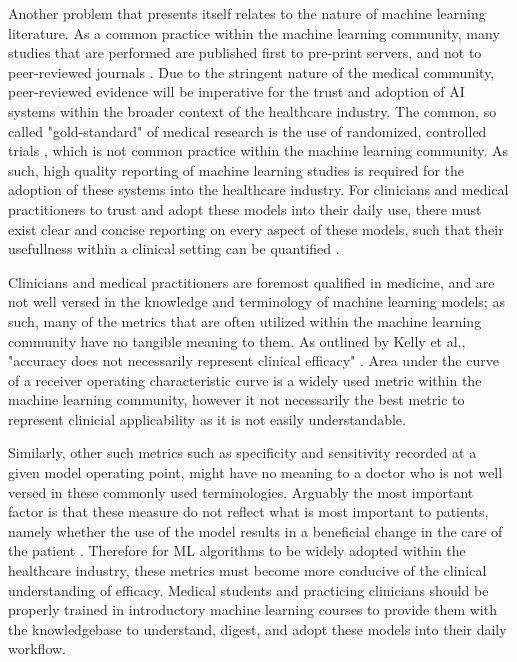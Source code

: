 \documentclass[12pt]{article}
\begin{document}
Another problem that presents itself relates to the nature of machine learning literature. As a common practice within the machine learning community, many studies that are performed are published first to pre-print servers, and not 
to peer-reviewed journals \citep{Kelly_2019}. Due to the stringent nature of the medical community, peer-reviewed evidence will be imperative for the trust and adoption of AI systems within the broader context of the healthcare industry.
The common, so called "gold-standard" of medical research is the use of randomized, controlled trials \citep{Kelly_2019,Khan_2023}, which is not common practice within the machine learning community. As such, high quality reporting of machine learning studies is required for the adoption of these systems into the healthcare industry. For clinicians and medical practitioners to trust and adopt these models into their daily use, there must exist clear and concise reporting on every aspect of these models, such that their usefullness within a clinical setting can be quantified \citep{Kelly_2019}. \

Clinicians and medical practitioners are foremost qualified in medicine, and are not well versed in the knowledge and terminology of machine learning models; as such, many of the metrics that are often utilized within the machine learning community have no tangible meaning to them. As outlined by Kelly et al., "accuracy does not necessarily represent clinical efficacy" \citep{Kelly_2019}. Area under the curve of a receiver operating characteristic curve is a widely used metric within the machine learning community, however it not necessarily the best metric to represent clinicial applicability as it is not easily understandable. \

\newpage

Similarly, other such metrics such as specificity and sensitivity recorded at a given model operating point, might have no meaning to a doctor who is not well versed in these commonly used terminologies. Arguably the most important factor is that these measure do not reflect what is most important to patients, namely whether the use of the model results in a beneficial change in the care of the patient \citep{Kelly_2019}. Therefore for ML algorithms to be widely adopted within the healthcare industry, these metrics must become more conducive of the clinical understanding of efficacy. Medical students and practicing clinicians should be properly trained in introductory machine learning courses to provide them with the knowledgebase to understand, digest, and adopt these models into their daily workflow.\
\end{document}
